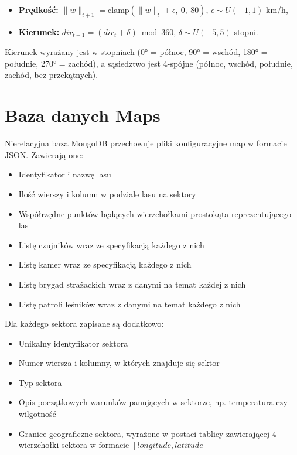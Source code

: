 \begin{itemize}
    \item \textbf{Prędkość:} $\|w\|_{t+1} = \mathrm{clamp}(\|w\|_t + \epsilon,\ 0,\ 80)$, $\epsilon \sim U(-1, 1)$ km/h,
    \item \textbf{Kierunek:} $dir_{t+1} = (dir_t + \delta) \bmod 360$, $\delta \sim U(-5, 5)$ stopni.
\end{itemize}

Kierunek wyrażany jest w stopniach (0° = północ, 90° = wschód, 180° = południe, 270° = zachód), a sąsiedztwo jest 4-spójne (północ, wschód, południe, zachód, bez przekątnych).

\section{Baza danych Maps}

Nierelacyjna baza MongoDB przechowuje pliki konfiguracyjne map w formacie JSON. Zawierają one:
\begin{itemize}
    \item Identyfikator i nazwę lasu
    \item Ilość wierszy i kolumn w podziale lasu na sektory
    \item Współrzędne punktów będących wierzchołkami prostokąta reprezentującego las
    \item Listę czujników wraz ze specyfikacją każdego z nich
    \item Listę kamer wraz ze specyfikacją każdego z nich
    \item Listę brygad strażackich wraz z danymi na temat każdej z nich
    \item Listę patroli leśników wraz z danymi na temat każdego z nich
\end{itemize}

Dla każdego sektora zapisane są dodatkowo:
\begin{itemize}
    \item Unikalny identyfikator sektora
    \item Numer wiersza i kolumny, w których znajduje się sektor
    \item Typ sektora
    \item Opis początkowych warunków panujących w sektorze, np. temperatura czy wilgotność
    \item Granice geograficzne sektora, wyrażone w postaci tablicy zawierającej 4 wierzchołki sektora w formacie \([longitude, latitude]\)
\end{itemize}

